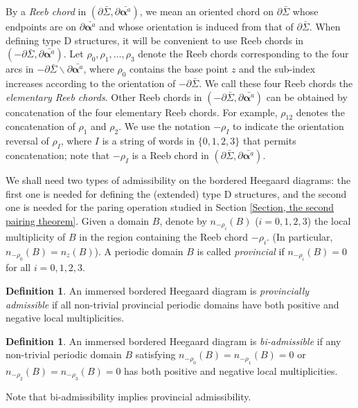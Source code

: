 \documentclass{amsart}
\theoremstyle{definition}
\newtheorem{defn}[thm]{Definition}
\theoremstyle{remark}
\numberwithin{equation}{section}
\numberwithin{equation}{section} \makeatletter
\begin{document}
By a \textit{Reeb chord} in $(\partial\bar{\Sigma}, \partial \bar{\bm{\alpha}^a})$, we mean an oriented chord on $\partial\bar{\Sigma}$ whose endpoints are on $\partial \bar{\bm{\alpha}^a}$ and whose orientation is induced from that of $\partial\bar{\Sigma}$. When defining type D structures, it will be convenient to use Reeb chords in $(-\partial\bar{\Sigma}, \partial \bar{\bm{\alpha}^a})$. Let $\rho_0, \rho_1, \ldots,\rho_{3}$ denote the Reeb chords corresponding to the four arcs in $-\partial\bar{\Sigma}\backslash \partial\bar{\bm{\alpha}^a}$, where $\rho_0$ contains the base point $z$ and the sub-index increases according to the orientation of $-\partial\bar{\Sigma}$. We call these four Reeb chords the \textit{elementary Reeb chords}. Other Reeb chords in $(-\partial\bar{\Sigma}, \partial \bar{\bm{\alpha}^a})$ can be obtained by concatenation of the four elementary Reeb chords. For example, $\rho_{12}$ denotes the concatenation of $\rho_1$ and $\rho_2$. We use the notation $-\rho_I$ to indicate the orientation reversal of $\rho_I$, where $I$ is a string of words in $\{0,1,2,3\}$ that permits concatenation; note that $-\rho_I$ is a Reeb chord in $(\partial\bar{\Sigma}, \partial \bar{\bm{\alpha}^a})$.

 We shall need two types of admissibility on the bordered Heegaard diagrams: the first one is needed for defining the (extended) type D structures, and the second one is needed for the paring operation studied in Section \ref{Section, the second pairing theorem}. Given a domain $B$, denote by $n_{-\rho_i}(B)$ ($i=0,1,2,3$) the local multiplicity of $B$ in the region containing the Reeb chord $-\rho_i$. (In particular, $n_{-\rho_0}(B)=n_z(B)$). A periodic domain $B$ is called \emph{provincial} if $n_{-\rho_i}(B)=0$ for all $i=0,1,2,3$. 
\begin{defn}\label{Definition, provinical admissibility}
An immersed bordered Heegaard diagram is \emph{provincially admissible} if all non-trivial provincial periodic domains have both positive and negative local multiplicities.
\end{defn}

\begin{defn}\label{Definition, bi-admissibility}
An immersed bordered Heegaard diagram is \emph{bi-admissible} if any non-trivial periodic domain $B$ satisfying $n_{-\rho_0}(B)=n_{-\rho_1}(B)=0$ or $n_{-\rho_2}(B)=n_{-\rho_3}(B)=0$ has both positive and negative local multiplicities.
\end{defn}

Note that bi-admissibility implies provincial admissibility. 
\end{document}

